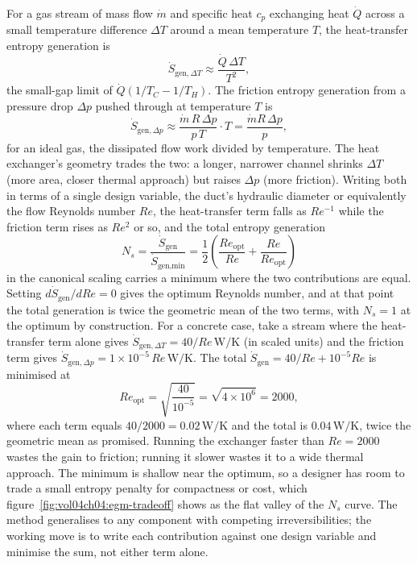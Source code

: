 For a gas stream of mass flow $\dot m$ and specific heat $c_p$ exchanging heat
$\dot Q$ across a small temperature difference $\Delta T$ around a mean
temperature $T$, the heat-transfer entropy generation is
\[
\dot S_{\text{gen},\Delta T} \approx \frac{\dot Q\,\Delta T}{T^2},
\]
the small-gap limit of $\dot Q(1/T_C - 1/T_H)$. The friction entropy generation
from a pressure drop $\Delta p$ pushed through at temperature $T$ is
\[
\dot S_{\text{gen},\Delta p} \approx \frac{\dot m\,R\,\Delta p}{p\,T}\cdot T
= \frac{\dot m R\,\Delta p}{p},
\]
for an ideal gas, the dissipated flow work divided by temperature. The heat
exchanger's geometry trades the two: a longer, narrower channel shrinks $\Delta
T$ (more area, closer thermal approach) but raises $\Delta p$ (more friction).
Writing both in terms of a single design variable, the duct's hydraulic
diameter or equivalently the flow Reynolds number $Re$, the heat-transfer term
falls as $Re^{-1}$ while the friction term rises as $Re^{2}$ or so, and the
total entropy generation
\[
N_s = \frac{\dot S_{\text{gen}}}{\dot S_{\text{gen,min}}}
= \frac{1}{2}\left(\frac{Re_{\text{opt}}}{Re} + \frac{Re}{Re_{\text{opt}}}\right)
\]
in the canonical scaling carries a minimum where the two contributions are
equal. Setting $d\dot S_{\text{gen}}/dRe = 0$ gives the optimum Reynolds
number, and at that point the total generation is twice the geometric mean of
the two terms, with $N_s = 1$ at the optimum by construction. For a concrete
case, take a stream where the heat-transfer term alone gives
$\dot S_{\text{gen},\Delta T} = 40/Re\,\si{\watt\per\kelvin}$ (in scaled units)
and the friction term gives $\dot S_{\text{gen},\Delta p} =
1\times10^{-5}\,Re\,\si{\watt\per\kelvin}$. The total
$\dot S_{\text{gen}} = 40/Re + 10^{-5}Re$ is minimised at
\[
Re_{\text{opt}} = \sqrt{\frac{40}{10^{-5}}} = \sqrt{4\times10^{6}} = 2000,
\]
where each term equals $40/2000 = 0.02\,\si{\watt\per\kelvin}$ and the total is
$0.04\,\si{\watt\per\kelvin}$, twice the geometric mean as promised. Running the
exchanger faster than $Re = 2000$ wastes the gain to friction; running it slower
wastes it to a wide thermal approach. The minimum is shallow near the optimum,
so a designer has room to trade a small entropy penalty for compactness or cost,
which figure~\ref{fig:vol04ch04:egm-tradeoff} shows as the flat valley of the
$N_s$ curve. The method generalises to any component with competing
irreversibilities; the working move is to write each contribution against one
design variable and minimise the sum, not either term alone.

